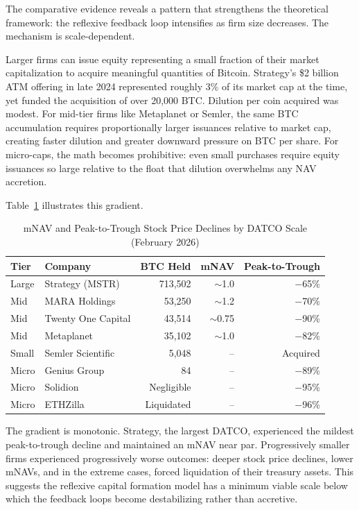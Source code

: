 The comparative evidence reveals a pattern that strengthens the theoretical framework: the reflexive feedback loop intensifies as firm size decreases. The mechanism is scale-dependent.

Larger firms can issue equity representing a small fraction of their market capitalization to acquire meaningful quantities of Bitcoin. Strategy's \$2 billion ATM offering in late 2024 represented roughly 3\% of its market cap at the time, yet funded the acquisition of over 20,000 BTC. Dilution per coin acquired was modest. For mid-tier firms like Metaplanet or Semler, the same BTC accumulation requires proportionally larger issuances relative to market cap, creating faster dilution and greater downward pressure on BTC per share. For micro-caps, the math becomes prohibitive: even small purchases require equity issuances so large relative to the float that dilution overwhelms any NAV accretion.

Table~\ref{tab:reflexivity_gradient} illustrates this gradient.

\begin{table}[H]
\centering
\caption[mNAV and Peak-to-Trough Declines by DATCO Scale]{mNAV and Peak-to-Trough Stock Price Declines by DATCO Scale (February 2026)}
\label{tab:reflexivity_gradient}
\begin{tabular}{@{}llrrr@{}}
\toprule
\textbf{Tier} & \textbf{Company} & \textbf{BTC Held} & \textbf{mNAV} & \textbf{Peak-to-Trough} \\
\midrule
Large & Strategy (MSTR) & 713,502 & $\sim$1.0 & $-$65\% \\
Mid & MARA Holdings & 53,250 & $\sim$1.2 & $-$70\% \\
Mid & Twenty One Capital & 43,514 & $\sim$0.75 & $-$90\% \\
Mid & Metaplanet & 35,102 & $\sim$1.0 & $-$82\% \\
Small & Semler Scientific & 5,048 & -- & Acquired \\
Micro & Genius Group & 84 & -- & $-$89\% \\
Micro & Solidion & Negligible & -- & $-$95\% \\
Micro & ETHZilla & Liquidated & -- & $-$96\% \\
\bottomrule
\end{tabular}
\end{table}

The gradient is monotonic. Strategy, the largest DATCO, experienced the mildest peak-to-trough decline and maintained an mNAV near par. Progressively smaller firms experienced progressively worse outcomes: deeper stock price declines, lower mNAVs, and in the extreme cases, forced liquidation of their treasury assets. This suggests the reflexive capital formation model has a minimum viable scale below which the feedback loops become destabilizing rather than accretive.

